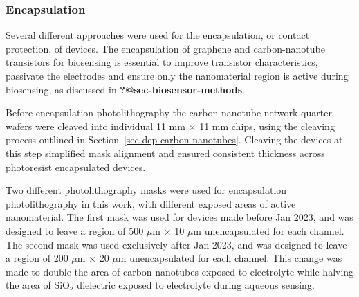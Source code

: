 \documentclass[
  letterpaper,
  DIV=11,
  numbers=noendperiod]{scrartcl}
\begin{document}
\hypertarget{sec-encapsulation}{%
\subsubsection{Encapsulation}\label{sec-encapsulation}}

Several different approaches were used for the encapsulation, or contact
protection, of devices. The encapsulation of graphene and
carbon-nanotube transistors for biosensing is essential to improve
transistor characteristics, passivate the electrodes and ensure only the
nanomaterial region is active during biosensing, as discussed in
\textbf{?@sec-biosensor-methods}.

Before encapsulation photolithography the carbon-nanotube network
quarter wafers were cleaved into individual 11 mm \(\times\) 11 mm
chips, using the cleaving process outlined in
Section~\ref{sec-dep-carbon-nanotubes}. Cleaving the devices at this
step simplified mask alignment and ensured consistent thickness across
photoresist encapsulated devices.

Two different photolithography masks were used for encapsulation
photolithography in this work, with different exposed areas of active
nanomaterial. The first mask was used for devices made before Jan 2023,
and was designed to leave a region of 500 \(\mu\)m \(\times\) 10
\(\mu\)m unencapsulated for each channel. The second mask was used
exclusively after Jan 2023, and was designed to leave a region of 200
\(\mu\)m \(\times\) 20 \(\mu\)m unencapsulated for each channel. This
change was made to double the area of carbon nanotubes exposed to
electrolyte while halving the area of SiO\(_2\) dielectric exposed to
electrolyte during aqueous sensing.
\end{document}
